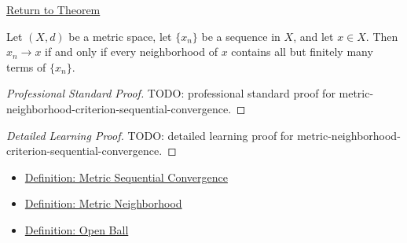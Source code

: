 \newpage
{}
\label{prf:metric-neighborhood-criterion-sequential-convergence}

\begin{remark*}[Return]
\hyperref[thm:metric-neighborhood-criterion-sequential-convergence]{Return to Theorem}
\end{remark*}

\begin{theorem*}
Let \((X,d)\) be a metric space, let \(\{x_n\}\) be a sequence in \(X\), and
let \(x\in X\).  Then \(x_n\to x\) if and only if every neighborhood of \(x\)
contains all but finitely many terms of \(\{x_n\}\).
\end{theorem*}

\begin{proof}[Professional Standard Proof]
\LRAProofBodyStart
TODO: professional standard proof for metric-neighborhood-criterion-sequential-convergence.
\end{proof}

\begin{proof}[Detailed Learning Proof]
\LRAProofBodyStart
TODO: detailed learning proof for metric-neighborhood-criterion-sequential-convergence.
\end{proof}

\begin{remark*}
\end{remark*}

\begin{dependencies}
\begin{itemize}
  \item \hyperref[def:metric-sequential-convergence]{Definition: Metric Sequential Convergence}
  \item \hyperref[def:metric-neighborhood]{Definition: Metric Neighborhood}
  \item \hyperref[def:metric-open-ball]{Definition: Open Ball}
\end{itemize}
\end{dependencies}

\clearpage
